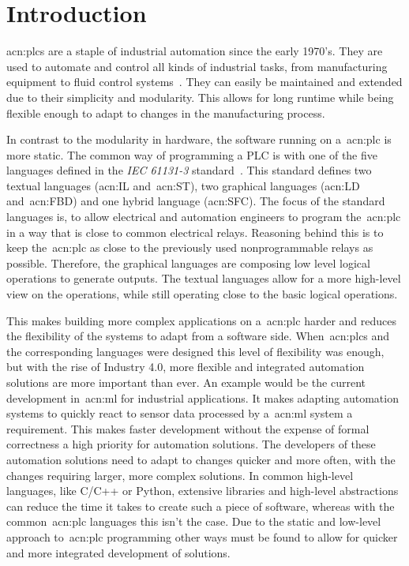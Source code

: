 
\section{Introduction}
\label{sec:Introduction}

\glspl{acn:plc} are a staple of industrial automation since the early 1970's.
They are used to automate and control all kinds of industrial tasks, from manufacturing equipment to fluid control systems~\cite{Erickson:1996aa}.
They can easily be maintained and extended due to their simplicity and modularity.
This allows for long runtime while being flexible enough to adapt to changes in the manufacturing process.

In contrast to the modularity in hardware, the software running on a~\gls{acn:plc} is more static.
The common way of programming a PLC is with one of the five languages defined in the \textit{IEC 61131-3} standard~\cite{Plcopen:61131-3}.
This standard defines two textual languages (\gls{acn:IL} and~\gls{acn:ST}), two graphical languages (\gls{acn:LD} and~\gls{acn:FBD}) and one hybrid language (\gls{acn:SFC}).
The focus of the standard languages is, to allow electrical and automation engineers to program the~\gls{acn:plc} in a way that is close to common electrical relays.
Reasoning behind this is to keep the~\gls{acn:plc} as close to the previously used nonprogrammable relays as possible.
Therefore, the graphical languages are composing low level logical operations to generate outputs.
The textual languages allow for a more high-level view on the operations, while still operating close to the basic logical operations.

This makes building more complex applications on a~\gls{acn:plc} harder and reduces the flexibility of the systems to adapt from a software side.
When~\glspl{acn:plc} and the corresponding languages were designed this level of flexibility was enough, but with the rise of Industry 4.0, more flexible and integrated automation solutions are more important than ever.
An example would be the current development in~\gls{acn:ml} for industrial applications.
It makes adapting automation systems to quickly react to sensor data processed by a~\gls{acn:ml} system a requirement.
This makes faster development without the expense of formal correctness a high priority for automation solutions.
The developers of these automation solutions need to adapt to changes quicker and more often, with the changes requiring larger, more complex solutions.
In common high-level languages, like C/C++ or Python, extensive libraries and high-level abstractions can reduce the time it takes to create such a piece of software, whereas with the common~\gls{acn:plc} languages this isn't the case.
Due to the static and low-level approach to~\gls{acn:plc} programming other ways must be found to allow for quicker and more integrated development of solutions.


